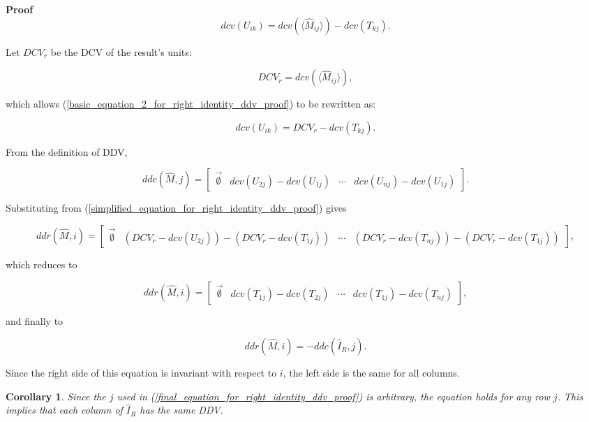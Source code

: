 \documentclass[10pt,letterpaper]{article}
\newtheorem{cor}{Corollary}[section]
\newenvironment{proof}{\noindent\textbf{Proof} }{\qed \newline}
\newcommand{\qed}{\nobreak \ifvmode \relax \else
      \ifdim\lastskip<1.5em \hskip-\lastskip
      \hskip1.5em plus0em minus0.5em \fi \nobreak
      \vrule height0.75em width0.5em depth0.25em\fi}
\numberwithin{equation}{section}
\begin{document}
\begin{proof}
\begin{equation} \label{basic_equation_2_for_right_identity_ddv_proof} dcv(U_{ik}) = dcv( \langle \hat M_{ij} \rangle ) - dcv(T_{kj}). \end{equation}

Let $DCV_r$ be the DCV of the result's units:

\[ DCV_r = dcv( \langle \hat M_{ij} \rangle ) , \]

which allows (\ref{basic_equation_2_for_right_identity_ddv_proof}) to
be rewritten as:

\begin{equation} \label{simplified_equation_for_right_identity_ddv_proof} dcv(U_{ik}) = DCV_r - dcv(T_{kj}) . \end{equation}

From the definition of DDV,

\[ ddc(\hat M, j) = \left[ \begin{matrix} \vec{\emptyset} & dcv(U_{2j}) - dcv(U_{1j}) & \cdots & dcv(U_{nj}) - dcv(U_{1j}) \end{matrix} \right] . \]

Substituting from (\ref{simplified_equation_for_right_identity_ddv_proof}) gives

\[ ddr(\hat M, i) = \left[ \begin{matrix} \vec{\emptyset} & (DCV_r - dcv(U_{2j})) - (DCV_r - dcv(T_{1j})) & \cdots & (DCV_r - dcv(T_{nj})) - (DCV_r - dcv(T_{1j})) \end{matrix} \right] , \]

which reduces to

\[ ddr(\hat M, i) = \left[ \begin{matrix} \vec{\emptyset} & dcv(T_{1j}) - dcv(T_{2j}) & \cdots & dcv(T_{1j}) - dcv(T_{nj}) \end{matrix} \right] , \]

and finally to

\begin{equation} \label{final_equation_for_right_identity_ddv_proof} ddr(\hat M, i) = -ddc(\hat I_R, j) . \end{equation} 

Since the right side of this equation is invariant with respect to
$i$, the left side is the same for all columns. \end{proof}

\begin{cor}Since the $j$ used in
  (\ref{final_equation_for_right_identity_ddv_proof}) is arbitrary,
  the equation holds for any row $j$.  This implies that each column
  of $\hat I_R$ has the same DDV.\end{cor}
\end{document}
